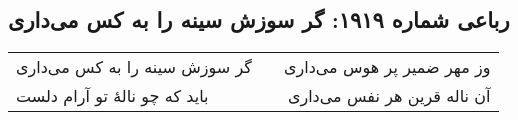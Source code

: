 \begin{center}
\section*{رباعی شماره ۱۹۱۹: گر سوزش سینه را به کس می‌داری}
\label{sec:1919}
\begin{longtable}{l p{0.5cm} r}
گر سوزش سینه را به کس می‌داری
&&
وز مهر ضمیر پر هوس می‌داری
\\
باید که چو نالهٔ تو آرام دلست
&&
آن ناله قرین هر نفس می‌داری
\\
\end{longtable}
\end{center}
